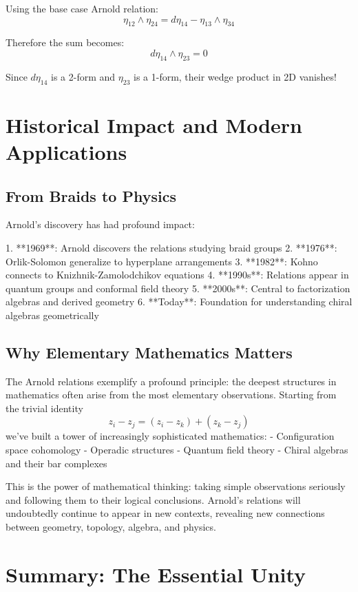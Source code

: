 Using the base case Arnold relation:
$$\eta_{12} \wedge \eta_{24} = d\eta_{14} - \eta_{13} \wedge \eta_{34}$$

Therefore the sum becomes:
$$d\eta_{14} \wedge \eta_{23} = 0$$

Since $d\eta_{14}$ is a 2-form and $\eta_{23}$ is a 1-form, their wedge product in 2D vanishes!

\section{Historical Impact and Modern Applications}

\subsection{From Braids to Physics}

Arnold's discovery has had profound impact:

1. **1969**: Arnold discovers the relations studying braid groups
2. **1976**: Orlik-Solomon generalize to hyperplane arrangements  
3. **1982**: Kohno connects to Knizhnik-Zamolodchikov equations
4. **1990s**: Relations appear in quantum groups and conformal field theory
5. **2000s**: Central to factorization algebras and derived geometry
6. **Today**: Foundation for understanding chiral algebras geometrically

\subsection{Why Elementary Mathematics Matters}

The Arnold relations exemplify a profound principle: the deepest structures in mathematics often arise from the most elementary observations. Starting from the trivial identity
$$z_i - z_j = (z_i - z_k) + (z_k - z_j)$$
we've built a tower of increasingly sophisticated mathematics:
- Configuration space cohomology
- Operadic structures
- Quantum field theory
- Chiral algebras and their bar complexes

This is the power of mathematical thinking: taking simple observations seriously and following them to their logical conclusions. Arnold's relations will undoubtedly continue to appear in new contexts, revealing new connections between geometry, topology, algebra, and physics.

\section{Summary: The Essential Unity}

